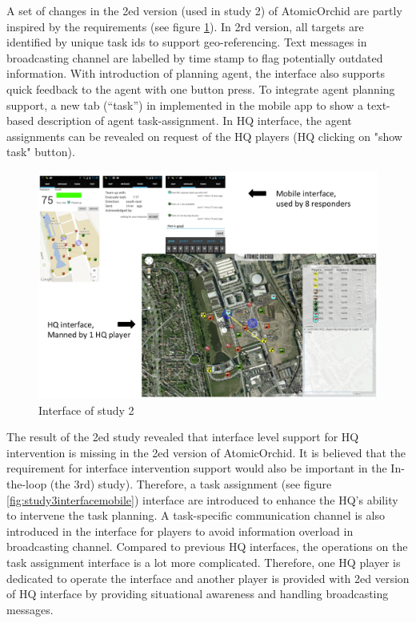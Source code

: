A set of changes in the 2ed version (used in study 2) of AtomicOrchid are partly inspired by the requirements (see figure \ref{fig:study2interface}). In 2rd version, all targets are identified by unique task ids to support geo-referencing. Text messages in broadcasting channel are labelled by time stamp to flag potentially outdated information. With introduction of planning agent, the interface also supports quick feedback to the agent with one button press. To integrate agent planning support, a new tab (``task'') in implemented in the mobile app to show a text-based description of agent task-assignment. In HQ interface, the agent assignments can be revealed on request of the HQ players (HQ clicking on "show task" button).\\

\begin{figure}[H]
  \centering
  \includegraphics[width=1\textwidth]{img/conclusion/study2interface}
  \caption{Interface of study 2}
  \label{fig:study2interface}
\end{figure}

The result of the 2ed study revealed that interface level support for HQ intervention is missing in the 2ed version of AtomicOrchid. It is believed that the requirement for interface intervention support would also be important in the In-the-loop (the 3rd) study). Therefore, a task assignment (see figure \ref{fig:study3interfacemobile}) interface are introduced to enhance the HQ's ability to intervene the task planning. A task-specific communication channel is also introduced in the interface for players to avoid information overload in broadcasting channel. Compared to previous HQ interfaces, the operations on the task assignment interface is a lot more complicated. Therefore, one HQ player is dedicated to operate the interface and another player is provided with 2ed version of HQ interface by providing situational awareness and handling broadcasting messages. 

